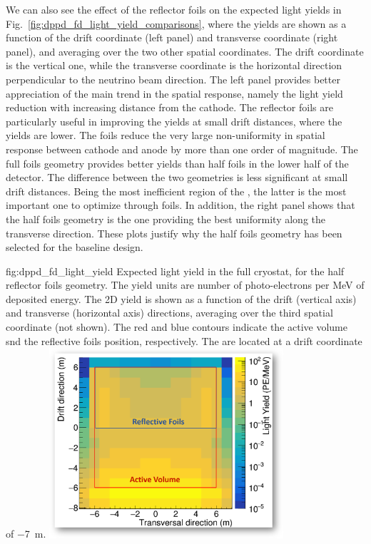 We can also see the effect of the  reflector foils on the expected light yields in Fig.~\ref{fig:dppd_fd_light_yield_comparisons}, where the yields are shown as a function of the drift coordinate (left panel) and transverse coordinate (right panel), and averaging over the two other spatial coordinates. The drift coordinate is the vertical one, while the transverse coordinate is the horizontal direction perpendicular to the neutrino beam direction. The left panel provides better appreciation of the main trend in the spatial response, namely the light yield reduction with increasing distance from the cathode. The  reflector foils are particularly useful in improving the yields at small drift distances, where the yields are lower. The foils reduce the very large non-uniformity in spatial response between cathode and anode by more than one order of magnitude. The full foils geometry provides better yields than half foils in the lower half of the detector. The difference between the two geometries is less significant at small drift distances. Being the most inefficient region of the , the latter is the most important one to optimize through foils. In addition, the right panel shows that the half foils geometry is the one providing the best uniformity along the transverse direction. These plots justify why the half  foils geometry has been selected for the  baseline design.     

\begin{dunefigure}{fig:dppd_fd_light_yield}
{Expected light yield in the full   cryostat, for the half  reflector foils geometry. The yield units are number of photo-electrons per \si{\MeV} of deposited energy. The 2D yield is shown as a function of the drift (vertical axis) and transverse (horizontal axis) directions, averaging over the third spatial coordinate (not shown). The red and blue contours indicate the  active volume snd the reflective foils position, respectively. The  are located at a drift coordinate of \SI{-7}{\m}.}
\includegraphics[width=0.65\textwidth]{graphics/dppd_PhotLibHalfFoil.png} 
\end{dunefigure}

